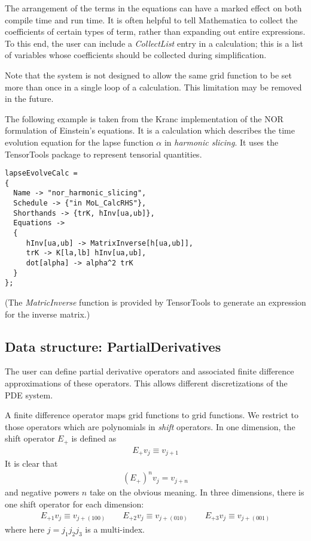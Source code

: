 \documentclass{report}
\begin{document}
The arrangement of the terms in the equations can have a marked effect
on both compile time and run time.  It is often helpful to tell
Mathematica to collect the coefficients of certain types of term,
rather than expanding out entire expressions.  To this end, the user
can include a {\em CollectList} entry in a calculation; this is a list
of variables whose coefficients should be collected during
simplification.

Note that the system is not designed to allow the same grid function
to be set more than once in a single loop of a calculation. This
limitation may be removed in the future.

The following example is taken from the Kranc implementation of the
NOR formulation of Einstein's equations.  It is a calculation which
describes the time evolution equation for the lapse function $\alpha$
in {\em harmonic slicing}. It uses the TensorTools package to
represent tensorial quantities.

\begin{center}
\begin{minipage}{0.8 \textwidth}
\begin{verbatim}
lapseEvolveCalc = 
{
  Name -> "nor_harmonic_slicing",
  Schedule -> {"in MoL_CalcRHS"},
  Shorthands -> {trK, hInv[ua,ub]},
  Equations -> 
  {
     hInv[ua,ub] -> MatrixInverse[h[ua,ub]],
     trK -> K[la,lb] hInv[ua,ub],
     dot[alpha] -> alpha^2 trK
  }
};
\end{verbatim}
\end{minipage}
\end{center}
(The {\it MatricInverse} function is provided by TensorTools to
generate an expression for the inverse matrix.)



\subsection{Data structure: PartialDerivatives}

The user can define partial derivative operators and associated finite
difference approximations of these operators.  This allows different
discretizations of the PDE system.

A finite difference operator maps grid functions to grid functions.
We restrict to those operators which are polynomials in {\em shift}
operators.  In one dimension, the shift operator $E_+$ is defined as 
\begin{eqnarray}
E_+ v_j \equiv v_{j+1}
\end{eqnarray}
It is clear that
\begin{eqnarray}
(E_+)^n v_j = v_{j+n}
\end{eqnarray}
and negative powers $n$ take on the obvious meaning. In three
dimensions, there is one shift operator for each dimension:
\begin{eqnarray}
E_{+1} v_j \equiv v_{j+(100)} \qquad
E_{+2} v_j \equiv v_{j+(010)} \qquad
E_{+3} v_j \equiv v_{j+(001)}
\end{eqnarray}
where here $j = j_1 j_2 j_3$ is a multi-index.
\end{document}
